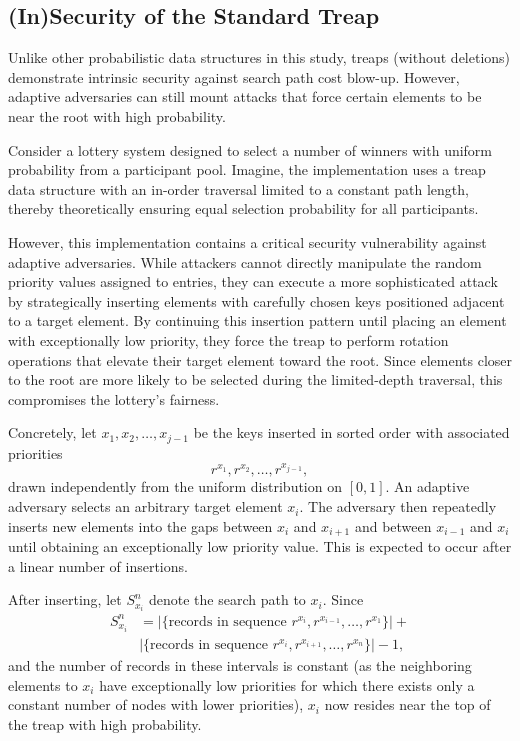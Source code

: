 \subsection{(In)Security of the Standard Treap}
Unlike other probabilistic data structures in this study, treaps (without deletions) demonstrate intrinsic security against search path cost blow-up. However, adaptive adversaries can still mount attacks that force certain elements to be near the root with high probability. 

Consider a lottery system designed to select a number of winners with uniform probability from a participant pool. Imagine, the implementation uses a treap data structure with an in-order traversal limited to a constant path length, thereby theoretically ensuring equal selection probability for all participants.

However, this implementation contains a critical security vulnerability against adaptive adversaries. While attackers cannot directly manipulate the random priority values assigned to entries, they can execute a more sophisticated attack by strategically inserting elements with carefully chosen keys positioned adjacent to a target element. By continuing this insertion pattern until placing an element with exceptionally low priority, they force the treap to perform rotation operations that elevate their target element toward the root. Since elements closer to the root are more likely to be selected during the limited-depth traversal, this compromises the lottery's fairness.

Concretely, let $x_1, x_2, \ldots, x_{j-1}$ be the keys inserted in sorted order with associated priorities 
$$r^{x_1}, r^{x_2}, \ldots, r^{x_{j-1}},$$
drawn independently from the uniform distribution on $[0,1]$. An adaptive adversary selects an arbitrary target element $x_i$. The adversary then repeatedly inserts new elements into the gaps between $x_i$ and $x_{i+1}$ and between $x_{i-1}$ and $x_i$ until obtaining an exceptionally low priority value. This is expected to occur after a linear number of insertions.

After inserting, let $S^n_{x_i}$ denote the search path to $x_i$. Since
\begin{align*}
S^n_{x_i} &= |\{\text{records in sequence } r^{x_i},r^{x_{i-1}},\ldots,r^{x_1}\}| + \\&|\{\text{records in sequence } r^{x_i},r^{x_{i+1}},\ldots,r^{x_n}\}| - 1,
\end{align*}
and the number of records in these intervals is constant (as the neighboring elements to $x_i$ have exceptionally low priorities for which there exists only a constant number of nodes with lower priorities), $x_i$ now resides near the top of the treap with high probability.

